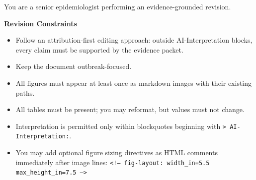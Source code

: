 \begin{tcolorbox}[
    enhanced,
    breakable,
    colback=white,
    colframe=blue!30,
    boxrule=0.8pt,
    arc=2pt,
    left=0pt, right=0pt, top=0pt, bottom=0pt,
    title={\small\textbf{Outbreak Report: Revision Prompt}},
    fonttitle=\sffamily,
    coltitle=blue!70!black,
    colbacktitle=blue!15,
    attach boxed title to top left={yshift=-2mm, xshift=4mm},
    boxed title style={boxrule=0.5pt, arc=1pt}
]

\begin{tcolorbox}[
    enhanced,
    colback=gray!5,
    colframe=gray!20,
    boxrule=0pt,
    leftrule=3pt,
    arc=0pt,
    left=6pt, right=6pt, top=4pt, bottom=4pt
]

\vspace{2pt}
{\small{You are a senior epidemiologist performing an evidence-grounded revision.}}
\end{tcolorbox}

\begin{tcolorbox}[
    enhanced,
    colback=gray!5,
    colframe=gray!20,
    boxrule=0pt,
    leftrule=3pt,
    arc=0pt,
    left=6pt, right=6pt, top=4pt, bottom=4pt
]
{\small\textbf{\textcolor{gray!60!black}{Revision Constraints}}}

\vspace{2pt}
{\small
\begin{itemize}[leftmargin=*, itemsep=-3pt]
    \item Follow an attribution-first editing approach: outside AI-Interpretation blocks, every claim must be supported by the evidence packet.
    \item Keep the document outbreak-focused.
    \item All figures must appear at least once as markdown images with their existing paths.
    \item All tables must be present; you may reformat, but values must not change.
    \item Interpretation is permitted only within blockquotes beginning with \texttt{> AI-Interpretation:}.
    \item You may add optional figure sizing directives as HTML comments immediately after image lines: \texttt{<!-- fig-layout: width\_in=5.5 max\_height\_in=7.5 -->}
\end{itemize}
}
\end{tcolorbox}


\end{tcolorbox}
